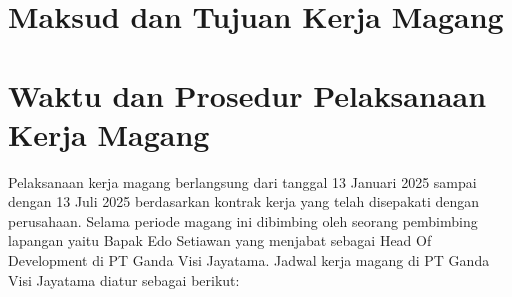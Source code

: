 

\section{Maksud dan Tujuan Kerja Magang}







\section{Waktu dan Prosedur Pelaksanaan Kerja Magang}

Pelaksanaan kerja magang berlangsung dari tanggal 13 Januari 2025 sampai dengan 
13 Juli 2025 berdasarkan kontrak kerja yang telah disepakati dengan 
perusahaan. Selama periode magang ini dibimbing oleh 
seorang pembimbing lapangan yaitu Bapak Edo Setiawan yang 
menjabat sebagai Head Of Development di PT Ganda Visi Jayatama. Jadwal 
kerja magang di PT Ganda Visi Jayatama diatur sebagai berikut:

